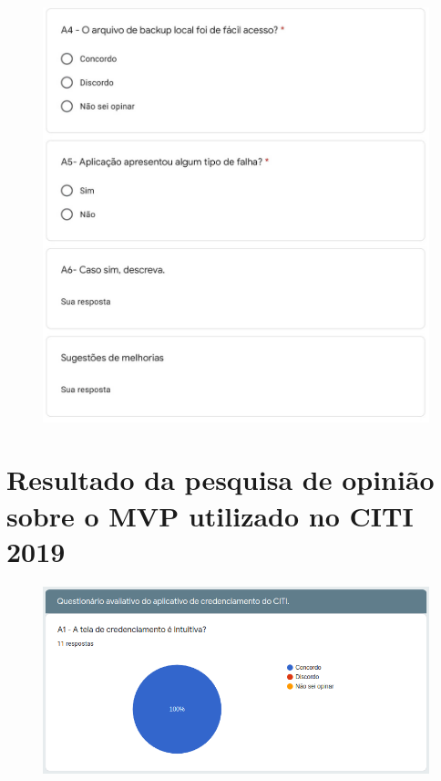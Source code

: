 \begin{figure}[H]
    \centering
    \includegraphics[scale=0.35]{figuras/questionario3.jpg}
\end{figure}

\chapter{Resultado da pesquisa de opinião sobre o MVP utilizado no CITI 2019}\label{apendice2}

\begin{figure}[H]
    \centering
    \includegraphics[scale=0.55]{figuras/form1.png}
\end{figure}

